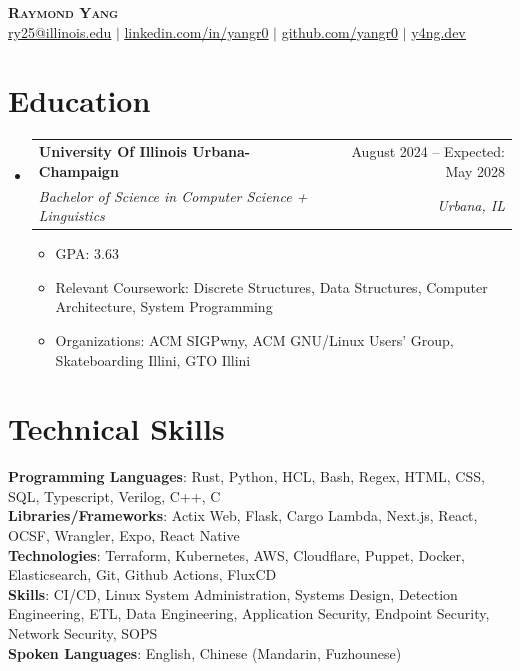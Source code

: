 \documentclass[letterpaper,11pt]{article}
\makeatletter
\newcommand{\resumeItem}[1]{
  \item\small{
    {#1 \vspace{-2pt}}
  }
}
\newcommand{\resumeSubheading}[4]{
  \vspace{-2pt}\item
    \begin{tabular*}{0.97\textwidth}[t]{l@{\extracolsep{\fill}}r}
      \textbf{#1} & #2 \\
      \textit{\small#3} & \textit{\small #4} \\
    \end{tabular*}\vspace{-7pt}
}
\newcommand{\resumeSubHeadingListStart}{\begin{itemize}[leftmargin=0in, label={}]}
\newcommand{\resumeSubHeadingListEnd}{\end{itemize}}
\newcommand{\resumeItemListStart}{\begin{itemize}}
\newcommand{\resumeItemListEnd}{\end{itemize}\vspace{-5pt}}
\makeatother
\begin{document}

\begin{center}
    \textbf{\Huge \scshape Raymond Yang} \\ \vspace{3pt}
    \href{ry25@illinois.edu}{\underline{ry25@illinois.edu}} $|$
    \href{linkedin.com/in/yangr0}{\underline{linkedin.com/in/yangr0}} $|$
    \href{https://github.com/yangr0}{\underline{github.com/yangr0}} $|$
    \href{https://y4ng.dev}{\underline{y4ng.dev}}
\end{center}

\section{Education}
  \resumeSubHeadingListStart
    \resumeSubheading
      {University Of Illinois Urbana-Champaign}{August 2024 -- Expected: May 2028}
      {Bachelor of Science in Computer Science + Linguistics}{Urbana, IL}
      \resumeItemListStart
        \resumeItem{GPA: 3.63}
        \resumeItem{Relevant Coursework: Discrete Structures, Data Structures, Computer Architecture, System Programming}
        \resumeItem{Organizations: ACM SIGPwny, ACM GNU/Linux Users' Group, Skateboarding Illini, GTO Illini}
      \resumeItemListEnd

  \resumeSubHeadingListEnd

\section{Technical Skills}
 \begin{itemize}[leftmargin=0in, label={}]
    \small{\item{
     \textbf{Programming Languages}{: Rust, Python, HCL, Bash, Regex, HTML, CSS, SQL, Typescript, Verilog, C++, C} \\
     \textbf{Libraries/Frameworks}{: Actix Web, Flask, Cargo Lambda, Next.js, React, OCSF, Wrangler, Expo, React Native} \\
     \textbf{Technologies}{: Terraform, Kubernetes, AWS, Cloudflare, Puppet, Docker, Elasticsearch, Git, Github Actions, FluxCD} \\
     \textbf{Skills}{: CI/CD, Linux System Administration, Systems Design, Detection Engineering, ETL, Data Engineering, Application Security, Endpoint Security, Network Security, SOPS} \\
     \textbf{Spoken Languages}{: English, Chinese (Mandarin, Fuzhounese)} \\
    }}
\end{itemize}
\end{document}
